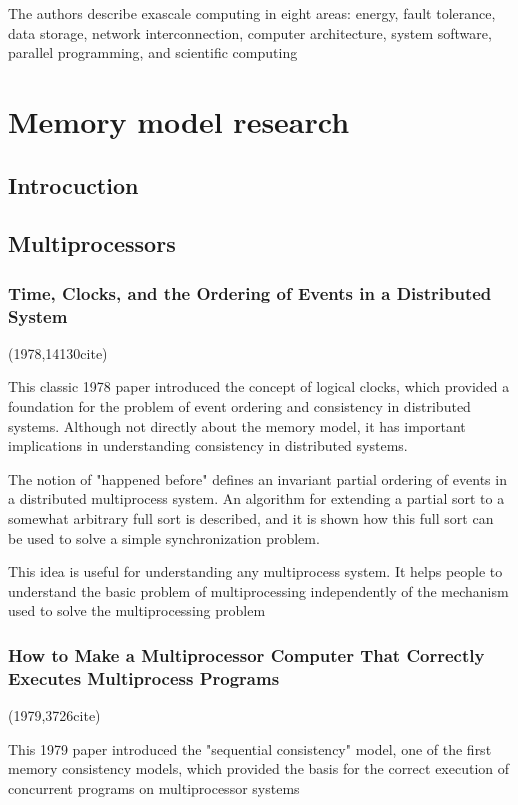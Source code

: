 \documentclass[a4paper,twoside]{scrbook}
\begin{document}
The authors describe exascale computing in eight areas: energy, fault tolerance, data storage, network interconnection, computer architecture, system software, parallel programming, and scientific computing


\chapter{Memory model research}
\section{Introcuction}
\section{Multiprocessors}
\subsection{Time, Clocks, and the Ordering of Events in a Distributed System\cite{lamport2019time}}
(1978,14130cite)\par
This classic 1978 paper introduced the concept of logical clocks, which provided a foundation for the problem of event ordering and consistency in distributed systems. Although not directly about the memory model, it has important implications in understanding consistency in distributed systems.

The notion of "happened before" defines an invariant partial ordering of events in a distributed multiprocess system. An algorithm for extending a partial sort to a somewhat arbitrary full sort is described, and it is shown how this full sort can be used to solve a simple synchronization problem.

This idea is useful for understanding any multiprocess system. It helps people to understand the basic problem of multiprocessing independently of the mechanism used to solve the multiprocessing problem
\subsection{How to Make a Multiprocessor Computer That Correctly Executes Multiprocess Programs\cite{lamport1979make}}
(1979,3726cite)\par
This 1979 paper introduced the "sequential consistency" model, one of the first memory consistency models, which provided the basis for the correct execution of concurrent programs on multiprocessor systems
\end{document}
